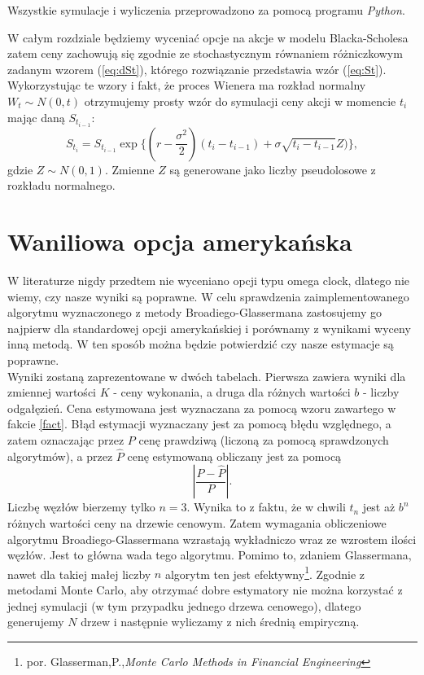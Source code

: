 \documentclass[]{pwr_wmat_praca_dyplomowa}
\theoremstyle{plain}
\numberwithin{theorem}{chapter}
\theoremstyle{definition}
\numberwithin{theorem}{chapter}
\begin{document}
Wszystkie symulacje i wyliczenia przeprowadzono za pomocą programu \textit{Python}.
\newline

W całym rozdziale będziemy wyceniać opcje na akcje w modelu Blacka-Scholesa zatem ceny zachowują się zgodnie ze stochastycznym równaniem różniczkowym zadanym wzorem (\ref{eq:dSt}), którego rozwiązanie przedstawia wzór (\ref{eq:St}). Wykorzystując te wzory i fakt, że proces Wienera ma rozkład normalny $W_t \sim N(0,t)$ otrzymujemy prosty wzór do symulacji ceny akcji w momencie $t_{i}$ mając daną $S_{t_{i-1}}$:
\begin{equation*}
S_{t_i} = S_{t_{i-1}} \exp\{(r-\frac{\sigma^2}{2})(t_i-t_{i-1})+\sigma\sqrt{t_i-t_{i-1}}Z)\},
\end{equation*}
gdzie $Z \sim N(0,1)$. Zmienne $Z$ są generowane jako liczby pseudolosowe z rozkładu normalnego.

\section{Waniliowa opcja amerykańska}

W literaturze nigdy przedtem nie wyceniano opcji typu omega clock, dlatego nie wiemy, czy nasze wyniki są poprawne. W celu sprawdzenia zaimplementowanego algorytmu wyznaczonego z metody Broadiego-Glassermana zastosujemy go najpierw dla standardowej opcji amerykańskiej i porównamy z wynikami wyceny inną metodą. W ten sposób można będzie potwierdzić czy nasze estymacje są poprawne.\\

Wyniki zostaną zaprezentowane w dwóch tabelach. Pierwsza zawiera wyniki dla zmiennej wartości $K$ - ceny wykonania, a druga dla różnych wartości $b$ - liczby odgałęzień. Cena estymowana jest wyznaczana za pomocą wzoru zawartego w fakcie \ref{fact}. Błąd estymacji wyznaczany jest za pomocą błędu względnego, a zatem oznaczając przez $P$ cenę prawdziwą (liczoną za pomocą sprawdzonych algorytmów), a przez $\hat{P}$ cenę estymowaną obliczany jest za pomocą $$\left|\frac{P-\hat{P}}{P}\right|.$$ Liczbę węzłów bierzemy tylko $n = 3$. Wynika to z faktu, że w chwili $t_n$ jest aż $b^n$ różnych wartości ceny na drzewie cenowym. Zatem wymagania obliczeniowe algorytmu Broadiego-Glassermana wzrastają wykładniczo wraz ze wzrostem ilości węzłów. Jest to główna wada tego algorytmu. Pomimo to, zdaniem Glassermana, nawet dla takiej małej liczby $n$ algorytm ten jest efektywny\footnote{por. Glasserman,P.,\textit{Monte Carlo Methods in Financial Engineering}}. Zgodnie z metodami Monte Carlo, aby otrzymać dobre estymatory nie można korzystać z jednej symulacji (w tym przypadku jednego drzewa cenowego), dlatego generujemy $N$ drzew i następnie wyliczamy z nich średnią empiryczną.
\end{document}
